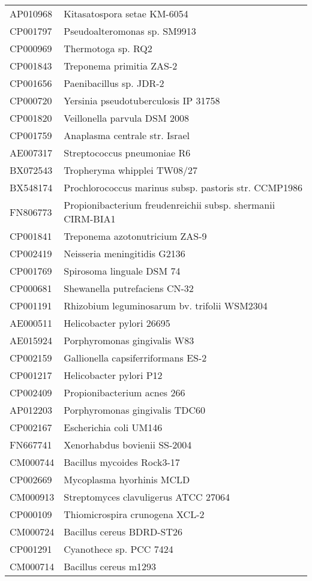 \begin{longtable}{ll}
AP010968 & Kitasatospora setae KM-6054\\
CP001797 & Pseudoalteromonas sp. SM9913\\
CP000969 & Thermotoga sp. RQ2\\
CP001843 & Treponema primitia ZAS-2\\
CP001656 & Paenibacillus sp. JDR-2\\
CP000720 & Yersinia pseudotuberculosis IP 31758\\
CP001820 & Veillonella parvula DSM 2008\\
CP001759 & Anaplasma centrale str. Israel\\
AE007317 & Streptococcus pneumoniae R6\\
BX072543 & Tropheryma whipplei TW08/27\\
BX548174 & Prochlorococcus marinus subsp. pastoris str. CCMP1986\\
FN806773 & Propionibacterium freudenreichii subsp. shermanii CIRM-BIA1\\
CP001841 & Treponema azotonutricium ZAS-9\\
CP002419 & Neisseria meningitidis G2136\\
CP001769 & Spirosoma linguale DSM 74\\
CP000681 & Shewanella putrefaciens CN-32\\
CP001191 & Rhizobium leguminosarum bv. trifolii WSM2304\\
AE000511 & Helicobacter pylori 26695\\
AE015924 & Porphyromonas gingivalis W83\\
CP002159 & Gallionella capsiferriformans ES-2\\
CP001217 & Helicobacter pylori P12\\
CP002409 & Propionibacterium acnes 266\\
AP012203 & Porphyromonas gingivalis TDC60\\
CP002167 & Escherichia coli UM146\\
FN667741 & Xenorhabdus bovienii SS-2004\\
CM000744 & Bacillus mycoides Rock3-17\\
CP002669 & Mycoplasma hyorhinis MCLD\\
CM000913 & Streptomyces clavuligerus ATCC 27064\\
CP000109 & Thiomicrospira crunogena XCL-2\\
CM000724 & Bacillus cereus BDRD-ST26\\
CP001291 & Cyanothece sp. PCC 7424\\
CM000714 & Bacillus cereus m1293\\

\end{longtable}

